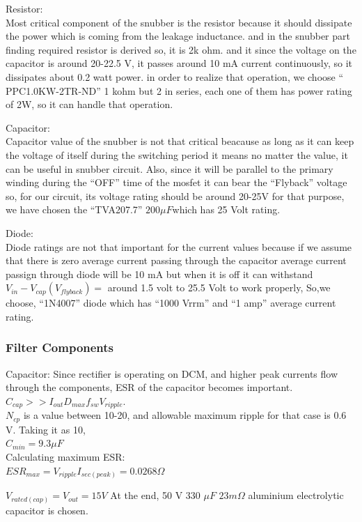 \documentclass{article}
\begin{document}
Resistor: \\Most critical component of the snubber is the resistor because it should dissipate the power which is coming from the leakage inductance. and in the snubber part finding required resistor is derived so, it is 2k ohm. and it since the voltage on the capacitor is around 20-22.5 V, it passes around 10 mA current continuously, so it dissipates about 0.2 watt power. in order to realize that operation, we choose “ PPC1.0KW-2TR-ND” 1 kohm but 2 in series, each one of them has power rating of 2W, so it can handle that operation.


Capacitor: \\Capacitor value of the snubber is not that critical beacause as long as it can keep the voltage of itself during the switching period it means no matter the value, it can be useful in snubber circuit. Also, since it will be parallel to the primary winding during the “OFF” time of the mosfet it can bear the “Flyback” voltage so, for our circuit, its voltage rating should be around 20-25V for that purpose, we have chosen the “TVA207.7” $ 200\mu F $which has 25 Volt rating.

Diode: \\Diode ratings are not that important for the current values because if we assume that there is zero average current passing through the capacitor average current passign through diode will be 10 mA but when it is off it can withstand $V_{in}-V_{cap}(V_{flyback})=$ around 1.5 volt to 25.5 Volt to work properly, So,we choose, “1N4007” diode which has “1000 Vrrm” and “1 amp” average current rating.




\subsubsection{Filter Components}


Capacitor: Since rectiﬁer is operating on DCM, and higher peak currents ﬂow through the components, ESR of the capacitor becomes important.
$C_{cap} >>I_{out}D_{max} f_{sw}V_{ripple}$.\\
$N_{cp}$ is a value between 10-20, and allowable maximum ripple for that case is 0.6 V. Taking it as 10,\\
$C_{min} = 9.3\mu F$\\
Calculating maximum ESR:\\
$ESR_{max} =V_{ripple} I_{sec(peak)}= 0.0268\Omega$

$V_{rated(cap)} = V_{out} = 15V$
At the end, 50 V 330 $\mu F $ $ 23 m\Omega$ aluminium electrolytic capacitor is chosen.
\end{document}

